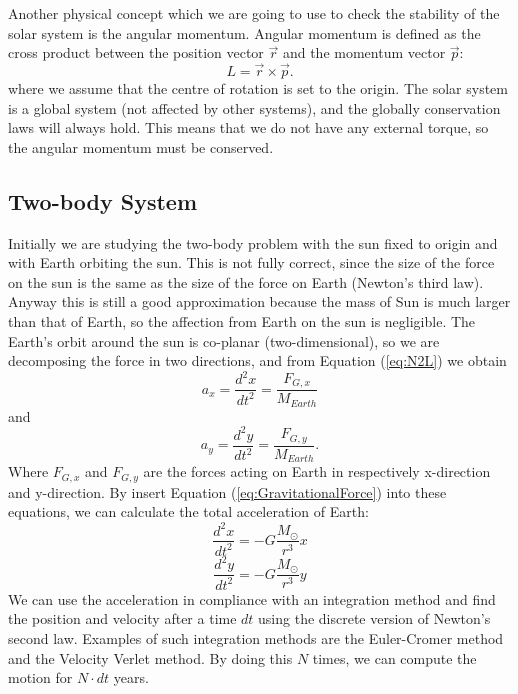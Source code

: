 \documentclass[norsk,a4paper,12pt]{article}
\begin{document}
Another physical concept which we are going to use to check the stability of the solar system is the angular momentum. Angular momentum is defined as the cross product between the position vector $\vec{r}$ and the momentum vector $\vec{p}$:
\begin{equation}
L=\vec{r}\times\vec{p}.
\end{equation}
where we assume that the centre of rotation is set to the origin. The solar system is a global system (not affected by other systems), and the globally conservation laws will always hold. This means that we do not have any external torque, so the angular momentum must be conserved. 
\subsection{Two-body System}
Initially we are studying the two-body problem with the sun fixed to origin and with Earth orbiting the sun. This is not fully correct, since the size of the force on the sun is the same as the size of the force on Earth (Newton's third law). Anyway this is still a good approximation because the mass of Sun is much larger than that of Earth, so the affection from Earth on the sun is negligible. The Earth's orbit around the sun is co-planar (two-dimensional), so we are decomposing the force in two directions, and from Equation (\ref{eq:N2L}) we obtain
\begin{equation}
a_x=\frac{d^2x}{dt^2}=\frac{F_{G,x}}{M_{Earth}}
\end{equation}
and
\begin{equation}
a_y=\frac{d^2y}{dt^2}=\frac{F_{G,y}}{M_{Earth}}.
\end{equation}
Where $F_{G,x}$ and $F_{G,y}$ are the forces acting on Earth in respectively x-direction and y-direction. By insert Equation (\ref{eq:GravitationalForce}) into these equations, we can calculate the total acceleration of Earth:
\begin{equation}
\frac{d^2x}{dt^2}=-G\frac{M_\odot}{r^3}x
\end{equation}
\begin{equation}
\frac{d^2y}{dt^2}=-G\frac{M_\odot}{r^3}y
\end{equation}
We can use the acceleration in compliance with an integration method and find the position and velocity after a time $dt$ using the discrete version of Newton's second law. Examples of such integration methods are the Euler-Cromer method and the Velocity Verlet method. By doing this $N$ times, we can compute the motion for $N\cdot dt$ years. 
\end{document}
